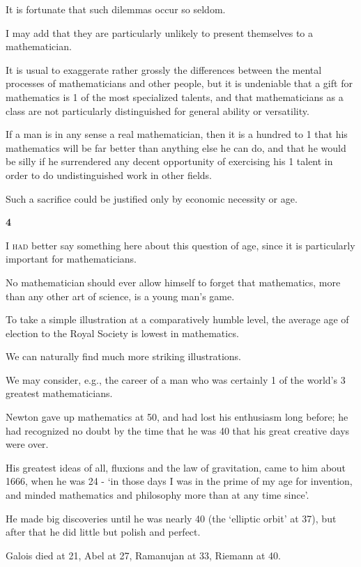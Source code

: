 \documentclass{article}
\numberwithin{equation}{section}
\begin{document}
It is fortunate that such dilemmas occur so seldom.

%
I may add that they are particularly unlikely to present themselves to a mathematician.

It is usual to exaggerate rather grossly the differences between the mental processes of mathematicians and other people, but it is undeniable that a gift for mathematics is 1 of the most specialized talents, and that mathematicians as a class are not particularly distinguished for general ability or versatility.

If a man is in any sense a real mathematician, then it is a hundred to 1 that his mathematics will be far better than anything else he can do, and that he would be silly if he surrendered any decent opportunity of exercising his 1 talent in order to do undistinguished work in other fields.

Such a sacrifice could be justified only by economic necessity or age.

\begin{center}
    \large\textbf{4}
\end{center}
\textsc{I had} better say something here about this question of age, since it is particularly important for mathematicians.

No mathematician should ever allow himself to forget that mathematics, more than any other art of science, is a young man's game.

To take a simple illustration at a comparatively humble level, the average age of election to the Royal Society is lowest in mathematics.

%
We can naturally find much more striking illustrations.

We may consider, e.g., the career of a man who was certainly 1 of the world's 3 greatest mathematicians.

Newton gave up mathematics at 50, and had lost his enthusiasm long before; he had recognized no doubt by the time that he was 40 that his great creative days were over.

His greatest ideas of all, fluxions and the law of gravitation, came to him about 1666, when he was 24 - `in those days I was in the prime of my age for invention, and minded mathematics and philosophy more than at any time since'.

He made big discoveries until he was nearly 40 (the `elliptic orbit' at 37), but after that he did little but polish and perfect.

%
Galois died at 21, Abel at 27, Ramanujan at 33, Riemann at 40.
\end{document}
